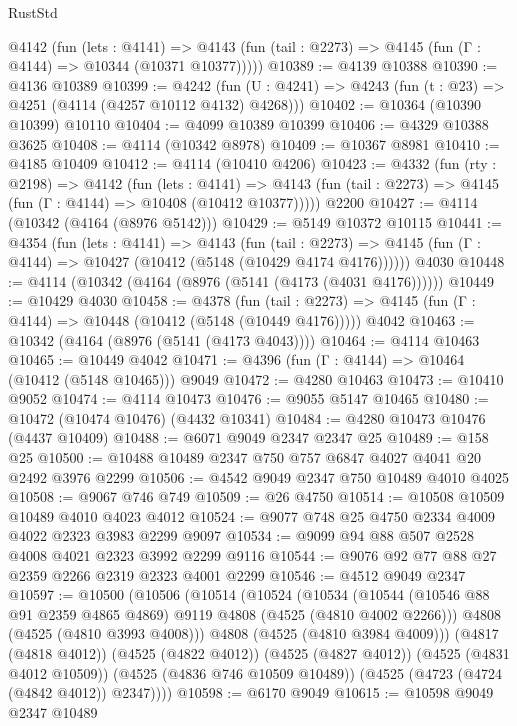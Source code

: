 \begin{lexlean}{RustStd}
\begin{coremodule}
{\begin{coremodule}
{{{{{{{{{{{{{{    @4142
      (fun (lets : @4141) =>
      @4143 (fun (tail : @2273) => @4145 (fun (Γ : @4144) => @10344 (@10371 @10377)))))
@10389 := @4139 @10388
@10390 := @4136 @10389
@10399 := @4242
    (fun (U : @4241) => @4243 (fun (t : @23) => @4251 (@4114 (@4257 @10112 @4132) @4268)))
@10402 := @10364 (@10390 @10399) @10110
@10404 := @4099 @10389 @10399
@10406 := @4329 @10388 @3625
@10408 := @4114 (@10342 @8978)
@10409 := @10367 @8981
@10410 := @4185 @10409
@10412 := @4114 (@10410 @4206)
@10423 := @4332
    (fun (rty : @2198) =>
    @4142
      (fun (lets : @4141) =>
      @4143 (fun (tail : @2273) => @4145 (fun (Γ : @4144) => @10408 (@10412 @10377)))))
    @2200
@10427 := @4114 (@10342 (@4164 (@8976 @5142)))
@10429 := @5149 @10372 @10115
@10441 := @4354
    (fun (lets : @4141) =>
    @4143
      (fun (tail : @2273) =>
      @4145 (fun (Γ : @4144) => @10427 (@10412 (@5148 (@10429 @4174 @4176))))))
    @4030
@10448 := @4114 (@10342 (@4164 (@8976 (@5141 (@4173 (@4031 @4176))))))
@10449 := @10429 @4030
@10458 := @4378
    (fun (tail : @2273) => @4145 (fun (Γ : @4144) => @10448 (@10412 (@5148 (@10449 @4176)))))
    @4042
@10463 := @10342 (@4164 (@8976 (@5141 (@4173 @4043))))
@10464 := @4114 @10463
@10465 := @10449 @4042
@10471 := @4396 (fun (Γ : @4144) => @10464 (@10412 (@5148 @10465))) @9049
@10472 := @4280 @10463
@10473 := @10410 @9052
@10474 := @4114 @10473
@10476 := @9055 @5147 @10465
@10480 := @10472 (@10474 @10476) (@4432 @10341)
@10484 := @4280 @10473 @10476 (@4437 @10409)
@10488 := @6071 @9049 @2347 @2347 @25
@10489 := @158 @25
@10500 := @10488 @10489 @2347 @750 @757 @6847 @4027 @4041 @20 @2492 @3976 @2299
@10506 := @4542 @9049 @2347 @750 @10489 @4010 @4025
@10508 := @9067 @746 @749
@10509 := @26 @4750
@10514 := @10508 @10509 @10489 @4010 @4023 @4012
@10524 := @9077 @748 @25 @4750 @2334 @4009 @4022 @2323 @3983 @2299 @9097
@10534 := @9099 @94 @88 @507 @2528 @4008 @4021 @2323 @3992 @2299 @9116
@10544 := @9076 @92 @77 @88 @27 @2359 @2266 @2319 @2323 @4001 @2299
@10546 := @4512 @9049 @2347
@10597 := @10500
    (@10506
      (@10514
        (@10524
          (@10534
            (@10544 (@10546 @88 @91 @2359 @4865 @4869) @9119 @4808 (@4525 (@4810 @4002 @2266)))
            @4808
            (@4525 (@4810 @3993 @4008)))
          @4808
          (@4525 (@4810 @3984 @4009)))
        (@4817 (@4818 @4012))
        (@4525 (@4822 @4012))
        (@4525 (@4827 @4012))
        (@4525 (@4831 @4012 @10509))
        (@4525 (@4836 @746 @10509 @10489))
        (@4525 (@4723 (@4724 (@4842 @4012)) @2347))))
@10598 := @6170 @9049
@10615 := @10598
    @9049
    @2347
    @10489
}}}}}}}}}}}}}}
\end{coremodule}}
\end{coremodule}
\end{lexlean}
